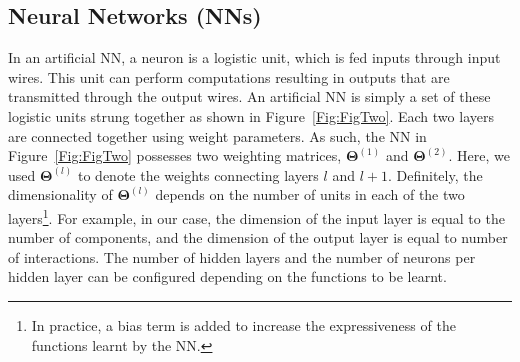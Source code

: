 \subsection{Neural Networks (NNs)}
In an artificial NN, a neuron is a logistic unit, which is fed inputs through input wires. This unit can perform computations resulting in outputs that are transmitted through the output wires. An artificial NN is simply a set of these logistic units strung together as shown in Figure~\ref{Fig:FigTwo}. Each two layers are connected together using weight parameters. As such, the NN in Figure~\ref{Fig:FigTwo} possesses two weighting matrices, $\bm{\Theta}^{(1)}$ and $\bm{\Theta}^{(2)}$. Here, we used $\bm{\Theta}^{(l)}$ to denote the weights connecting layers $l$ and $l+1$. Definitely, the dimensionality of $\bm{\Theta}^{(l)}$ depends on the number of units in each of the two layers\footnote{
In practice, a bias term is added to increase the expressiveness of the functions learnt by the NN.}. 
For example, in our case, the dimension of the input layer is equal to the number of components, and the dimension of the output layer is equal to number of interactions. The number of hidden layers and the number of neurons per hidden layer can be configured depending on the functions to be learnt. 

